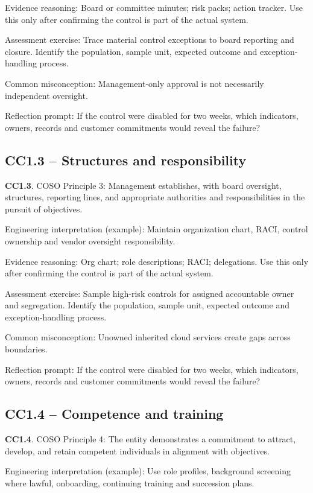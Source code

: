\documentclass[10pt,oneside]{report}
\begin{document}
Evidence reasoning: Board or committee minutes; risk packs; action tracker. Use this only after confirming the control is part of the actual system.

Assessment exercise: Trace material control exceptions to board reporting and closure. Identify the population, sample unit, expected outcome and exception-handling process.

Common misconception: Management-only approval is not necessarily independent oversight.

Reflection prompt: If the control were disabled for two weeks, which indicators, owners, records and customer commitments would reveal the failure?

\subsection{CC1.3 -- Structures and responsibility}
\begin{aicpabox}
\textbf{CC1.3}. COSO Principle 3: Management establishes, with board oversight, structures, reporting lines, and appropriate authorities and responsibilities in the pursuit of objectives.\par{}
\end{aicpabox}
Engineering interpretation (example): Maintain organization chart, RACI, control ownership and vendor oversight responsibility.

Evidence reasoning: Org chart; role descriptions; RACI; delegations. Use this only after confirming the control is part of the actual system.

Assessment exercise: Sample high-risk controls for assigned accountable owner and segregation. Identify the population, sample unit, expected outcome and exception-handling process.

Common misconception: Unowned inherited cloud services create gaps across boundaries.

Reflection prompt: If the control were disabled for two weeks, which indicators, owners, records and customer commitments would reveal the failure?

\subsection{CC1.4 -- Competence and training}
\begin{aicpabox}
\textbf{CC1.4}. COSO Principle 4: The entity demonstrates a commitment to attract, develop, and retain competent individuals in alignment with objectives.\par{}
\end{aicpabox}
Engineering interpretation (example): Use role profiles, background screening where lawful, onboarding, continuing training and succession plans.
\end{document}
